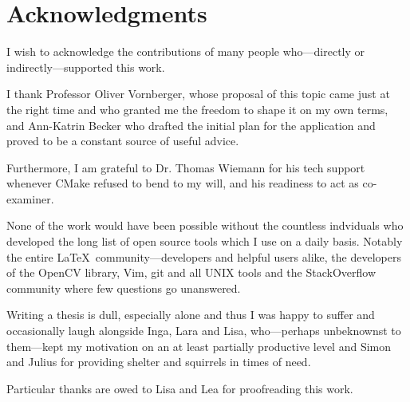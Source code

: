 \chapter*{Acknowledgments}

I wish to acknowledge the contributions of many people who---directly or
indirectly---supported this work. 

I thank Professor Oliver Vornberger, whose proposal of this topic came just at
the right time and who granted me the freedom to shape it on my own terms, and
Ann-Katrin Becker who drafted the initial plan for the application and
proved to be a constant source of useful advice.

Furthermore, I am grateful to Dr. Thomas Wiemann for his tech support
whenever CMake refused to bend to my will, and his readiness to act as
co-examiner.

None of the work would have been possible without the countless indviduals who
developed the long list of open source tools which I use on a daily basis.
Notably the entire \LaTeX\ community---developers and helpful users alike, the
developers of the OpenCV library, Vim, git and all UNIX tools and the
StackOverflow community where few questions go unanswered.

Writing a thesis is dull, especially alone and thus I was happy to suffer and
occasionally laugh alongside Inga, Lara and Lisa, who---perhaps unbeknownst to
them---kept my motivation on an at least partially productive level and Simon
and Julius for providing shelter and squirrels in times of need.

Particular thanks are owed to Lisa and Lea for proofreading this work.

